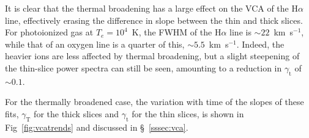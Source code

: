 \documentclass[useAMS,usenatbib]{mn2e}
\newcommand\gammaVCAthin{\ensuremath{\gamma_{\mathrm{t}}}}
\newcommand\gammaVCAvthick{\ensuremath{\gamma_{\mathrm{T}}}}
\begin{document}
It is clear that the thermal broadening has a large effect on the VCA
of the H$\alpha$ line, effectively erasing the difference in slope
between the thin and thick slices.  For photoionized gas at $T_e=
10^4$~K, the FWHM of the H$\alpha$ line is $\sim 22$~km~s$^{-1}$,
while that of an oxygen line is a quarter of this, $\sim
5.5$~km~s$^{-1}$.  Indeed, the heavier ions are less affected by thermal broadening, but a slight steepening of the thin-slice power spectra can still be seen, amounting to a reduction in \gammaVCAthin{} of \(\sim 0.1\). 

For the thermally broadened case, the variation with time of the
slopes of these fits, \gammaVCAvthick{} for the thick slices and
\gammaVCAthin{} for the thin slices, is shown in
Fig~\ref{fig:vcatrends} and discussed in \S~\ref{sssec:vca}.
\end{document}
